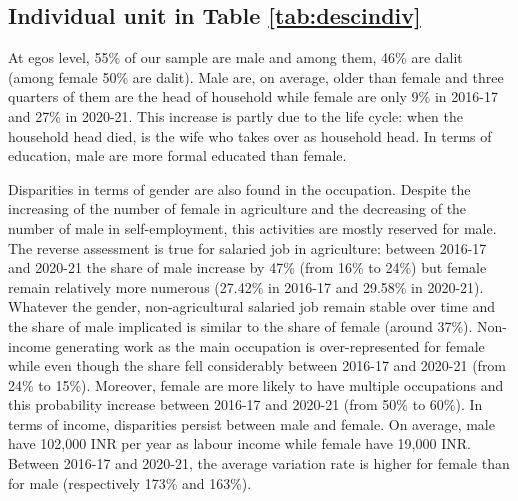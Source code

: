 \documentclass[a4paper, 11pt, onecolumn]{article}
\begin{document}

	\subsection{Individual unit in Table \ref{tab:descindiv}}

At egos level, 55\% of our sample are male and among them, 46\% are dalit (among female 50\% are dalit).
Male are, on average, older than female and three quarters of them are the head of household while female are only 9\% in 2016-17 and 27\% in 2020-21.
This increase is partly due to the life cycle: when the household head died, is the wife who takes over as household head.
In terms of education, male are more formal educated than female.

Disparities in terms of gender are also found in the occupation.
Despite the increasing of the number of female in agriculture and the decreasing of the number of male in self-employment, this activities are mostly reserved for male.
The reverse assessment is true for salaried job in agriculture: between 2016-17 and 2020-21 the share of male increase by 47\% (from 16\% to 24\%) but female remain relatively more numerous (27.42\% in 2016-17 and 29.58\% in 2020-21). 
Whatever the gender, non-agricultural salaried job remain stable over time and the share of male implicated is similar to the share of female (around 37\%).
Non-income generating work as the main occupation is over-represented for female while even though the share fell considerably between 2016-17 and 2020-21 (from 24\% to 15\%).
Moreover, female are more likely to have multiple occupations and this probability increase between 2016-17 and 2020-21 (from 50\% to 60\%).
In terms of income, disparities persist between male and female.
On average, male have 102,000 INR per year as labour income while female have 19,000 INR.
Between 2016-17 and 2020-21, the average variation rate is higher for female than for male (respectively 173\% and 163\%).
\end{document}
